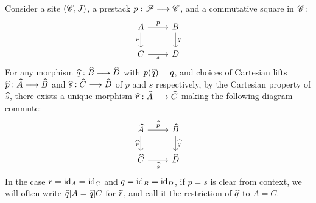 \documentclass[11pt]{amsart}
\begin{document}
\begin{defn}
Consider a site $(\mathscr{C}, J)$, a prestack $p : \sP \to \sC$, and a commutative square in $\mathscr{C}$:
\[\begin{tikzcd}
A \ar[r, "p"] \ar[d, "r" left] & B \ar[d, "q"] \\
C \ar[r, "s" below] & D
\end{tikzcd}\]
For any morphism $\wh{q} : \wh{B} \to \wh{D}$ with $p(\widehat{q}) = q$, and choices of Cartesian lifts
$\wh{p} : \wh{A} \to \wh{B}$ and $\wh{s} : \wh{C} \to \wh{D}$ of $p$ and $s$ respectively, by the
Cartesian property of $\widehat{s}$, there exists a unique morphism $\wh{r} : \wh{A} \to \wh{C}$ making
the following diagram commute:
\[\begin{tikzcd}
\wh{A} \ar[r, "\wh{p}"] \ar[d, "\wh{r}" left] & \wh{B} \ar[d, "\wh{q}"] \\
\wh{C} \ar[r, "\wh{s}" below] & \wh{D}
\end{tikzcd}\]
In the case $r = \mathrm{id}_A = \mathrm{id}_C$ and $q = \mathrm{id}_B = \mathrm{id}_D$, if $p = s$ is clear from context,
we will often write $\widehat{q}|A = \widehat{q}|C$ for $\widehat{r}$, and call it the restriction of
$\widehat{q}$ to $A = C$.
\end{defn}
\end{document}
